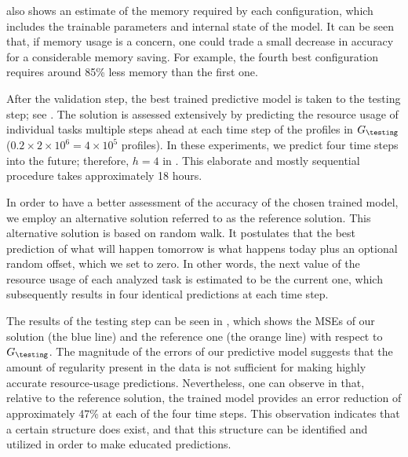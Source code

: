  also shows an estimate of the memory required by each
configuration, which includes the trainable parameters and internal state of the
model. It can be seen that, if memory usage is a concern, one could trade a
small decrease in accuracy for a considerable memory saving. For example, the
fourth best configuration requires around 85\% less memory than the first one.

After the validation step, the best trained predictive model is taken to the
testing step; see . The solution is assessed extensively by
predicting the resource usage of individual tasks multiple steps ahead at each
time step of the profiles in $G_\testing$ ($0.2 \times 2 \times 10^6 = 4 \times
10^5$ profiles). In these experiments, we predict four time steps into the
future; therefore, $h = 4$ in . This elaborate and mostly
sequential procedure takes approximately 18 hours.

In order to have a better assessment of the accuracy of the chosen trained
model, we employ an alternative solution referred to as the reference solution.
This alternative solution is based on random walk. It postulates that the best
prediction of what will happen tomorrow is what happens today plus an optional
random offset, which we set to zero. In other words, the next value of the
resource usage of each analyzed task is estimated to be the current one, which
subsequently results in four identical predictions at each time step.

The results of the testing step can be seen in , which shows
the \acp{MSE} of our solution (the blue line) and the reference one (the orange
line) with respect to $G_\testing$. The magnitude of the errors of our
predictive model suggests that the amount of regularity present in the data is
not sufficient for making highly accurate resource-usage predictions.
Nevertheless, one can observe in  that, relative to the
reference solution, the trained model provides an error reduction of
approximately 47\% at each of the four time steps. This observation indicates
that a certain structure does exist, and that this structure can be identified
and utilized in order to make educated predictions.
